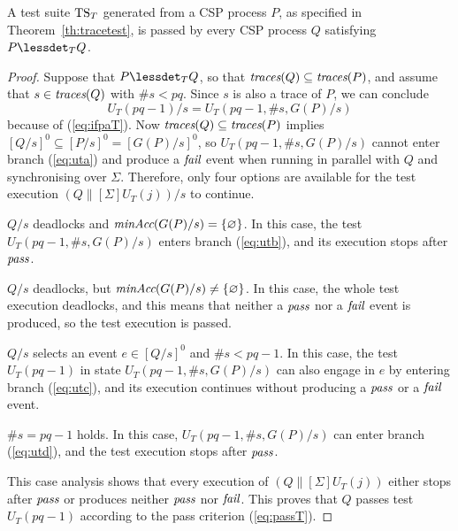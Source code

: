 \begin{lemma}\label{lemma:mainfsoundtrace}
A test suite ${\text{TS}}_T$ generated from a CSP process $P$, as specified in
Theorem~\ref{th:tracetest}, is passed by every CSP process $Q$ satisfying
$P\lessdet_T Q$.
\end{lemma}
\begin{proof}
Suppose that $P\lessdet_T Q$, so that $\text{\it traces}(Q)\subseteq\text{\it traces}(P)$, and assume
that $s\in\text{\it traces}(Q)$ with $\#s < pq$. Since $s$ is also a trace of $P$, we can
conclude
$$U_T(pq-1)/s = U_T(pq-1,\#s,G(P)/s)$$
because of (\ref{eq:ifpaT}). \pagebreak Now $\text{\it traces}(Q)\subseteq\text{\it traces}(P)$ implies
$[Q/s]^0\subseteq [P/s]^0 = [G(P)/s]^0$, so $U_T(pq-1,\#s,G(P)/s)$ cannot
enter branch (\ref{eq:uta}) and produce a ${\text{\it fail}}$ event when running in
parallel with $Q$ and synchronising over $\Sigma$. Therefore, only four
options are available for the test execution    $(Q\parallel[\Sigma]
U_T(j))/s$ to continue.

\medskip
{} $Q/s$ deadlocks and $\text{\it minAcc}(G(P)/s) = \{
\varnothing \}$. In this case, the test $U_T(pq-1,\#s,G(P)/s)$ enters branch
(\ref{eq:utb}), and its execution stops after ${\text{\it pass}}$.

\medskip
{} $Q/s$ deadlocks, but
$\text{\it minAcc}(G(P)/s)\neq\{\varnothing\}$. In this case, the whole test execution
deadlocks, and this means that neither a ${\text{\it pass}}$ nor a ${\text{\it fail}}$ event is
produced, so the test execution is passed.

\medskip
{} $Q/s$ selects an event $e\in[Q/s]^0$ and $\#s <
pq-1$. In this case, the test $U_T(pq-1)$ in state $U_T(pq-1,\#s,G(P)/s)$ can
also engage in $e$ by entering branch (\ref{eq:utc}), and its execution
continues without producing a ${\text{\it pass}}$ or a ${\text{\it fail}}$ event.

\medskip
{} $\#s = pq-1$ holds. In this case,
$U_T(pq-1,\#s,G(P)/s)$ can enter branch (\ref{eq:utd}), and the test
execution stops after ${\text{\it pass}}$.

\bigskip\noindent%
This case analysis shows that every   execution of $(Q\parallel[\Sigma]
U_T(j))$ either stops after ${\text{\it pass}}$ or produces neither ${\text{\it pass}}$ nor
${\text{\it fail}}$. This proves that $Q$ passes test $U_T(pq-1)$ according to the pass
criterion (\ref{eq:passT}). \xbox
\end{proof}

